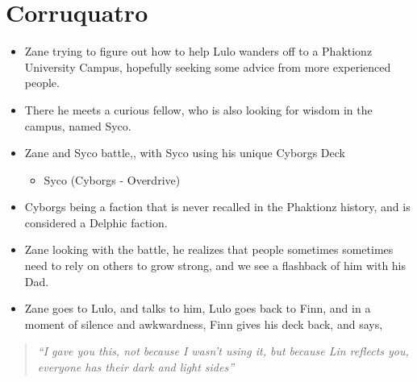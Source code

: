 \section{Corruquatro}
\begin{itemize}
    \item Zane trying to figure out how to help Lulo wanders off to a Phaktionz University Campus, hopefully seeking some advice from more experienced people.
    \item There he meets a curious fellow, who is also looking for wisdom in the campus, named Syco.
    \item Zane and Syco battle,, with Syco using his unique Cyborgs Deck
    \begin{itemize}
        \item  Syco (Cyborgs - Overdrive)
    \end{itemize}
    \item Cyborgs being a faction that is never recalled in the Phaktionz history, and is considered a Delphic faction.
    \item Zane looking with the battle, he realizes that people sometimes sometimes need to rely on others to grow strong, and we see a flashback of him with his Dad.
    \item Zane goes to Lulo, and talks to him, Lulo goes back to Finn, and in a moment of silence and awkwardness, Finn gives his deck back, and says,
\end{itemize}
\begin{quotation}
   \textit{ “I gave you this, not because I wasn’t using it, but because Lin reflects you, everyone has their dark and light sides”}
\end{quotation}